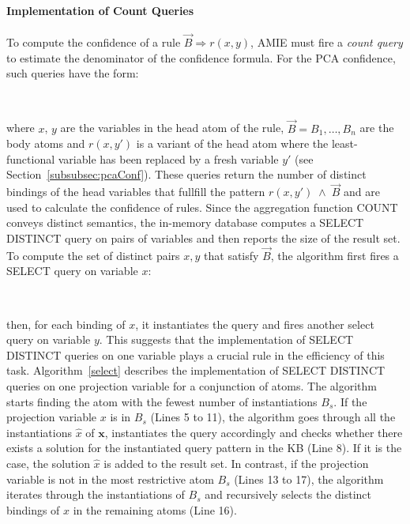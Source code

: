 \paragraph{Implementation of Count Queries} 
To compute the confidence of a rule $\vec{B} \Rightarrow r(x, y)$, AMIE must fire a \emph{count query} to estimate the denominator
of the confidence formula. For the PCA confidence, such queries have the form:\\ \vspace*{-0.2cm}

\\ \vspace*{-0.2cm}

\noindent where $x$, $y$ are the variables in the head atom of the rule, $\vec{B} = B_1, \dots, B_n$ are the body atoms and $r(x,y')$ 
is a variant of the head atom where the least-functional variable has been replaced by a fresh variable $y'$ (see Section~\ref{subsubsec:pcaConf}).
These queries return the number of distinct bindings of the head variables 
that fullfill the pattern $r(x, y')\; \wedge\; \vec{B}$ and are used to
calculate the confidence of rules. Since the aggregation function COUNT conveys
distinct semantics, the in-memory database computes a SELECT DISTINCT query on pairs of variables 
and then reports the size of the result set. To compute the set of distinct pairs $x, y$ that satisfy $\vec{B}$, 
the algorithm first fires a SELECT query on variable $x$: \\ \vspace*{-0.2cm}

 \\ \vspace*{-0.2cm}

\noindent then, for each binding of $x$, it instantiates the query and fires another select query on variable $y$.
This suggests that the implementation of SELECT DISTINCT queries on one variable plays a crucial rule in the efficiency of this task.
Algorithm~\ref{select} describes the implementation of SELECT DISTINCT queries on one projection variable for a conjunction of
atoms. 
The algorithm starts finding the atom with the fewest number 
of instantiations $B_s$. If the projection variable $x$ is in $B_s$ (Lines 5 to 11), 
the algorithm goes through all the instantiations $\hat{x}$ of $\bm{x}$, instantiates
the query accordingly and checks whether there exists a solution for the instantiated query pattern in the KB (Line 8). 
If it is the case, the solution $\hat{x}$ is added to the result set. In contrast, if the projection variable is not in the most 
restrictive atom $B_s$ (Lines 13 to 17), the algorithm iterates through the instantiations of $B_s$ and recursively selects the distinct
bindings of $x$ in the remaining atoms (Line 16).

